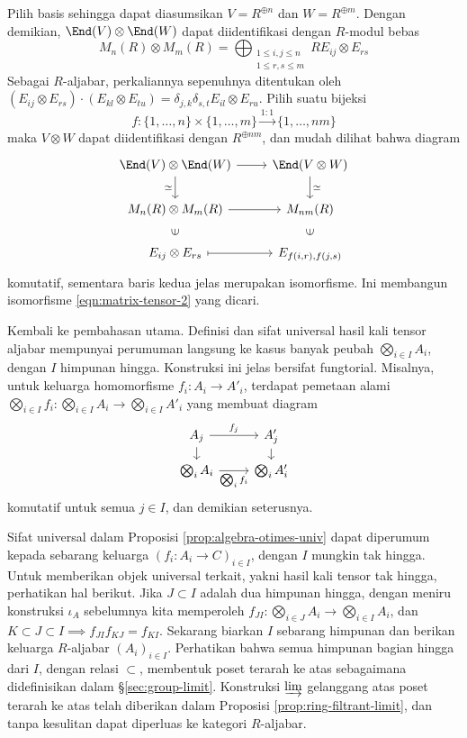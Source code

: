 \begin{example}
	Pilih basis sehingga dapat diasumsikan $V = R^{\oplus n}$ dan $W = R^{\oplus m}$. Dengan demikian, $\End(V) \otimes \End(W)$ dapat diidentifikasi dengan $R$-modul bebas
	\[ M_n(R) \otimes M_m(R) = \bigoplus_{\substack{1 \leq i,j \leq n \\ 1 \leq r,s \leq m}} R E_{ij} \otimes E_{rs}  \]
	Sebagai $R$-aljabar, perkaliannya sepenuhnya ditentukan oleh $(E_{ij} \otimes E_{rs}) \cdot (E_{kl} \otimes E_{tu}) = \delta_{j,k} \delta_{s,t} E_{il} \otimes E_{ru}$. Pilih suatu bijeksi
	\[ f: \{1, \ldots, n\} \times \{1, \ldots, m\} \xrightarrow{1:1} \{1, \ldots, nm\} \]
	maka $V \otimes W$ dapat diidentifikasi dengan $R^{\oplus nm}$, dan mudah dilihat bahwa diagram
	\[\begin{tikzcd}
		\End(V) \otimes \End(W) \arrow[d, "\simeq"'] \arrow[r] & \End(V \otimes W) \arrow[d, "\simeq"] \\
		M_n(R) \otimes M_m(R) \arrow[r] &  M_{nm}(R) \\
		E_{ij} \otimes E_{rs} \arrow[mapsto, r] \arrow[phantom, sloped, u, "\in" description] & E_{f(i,r), f(j,s)} \arrow[phantom, sloped, u, "\in" description]
	\end{tikzcd}\]
	komutatif, sementara baris kedua jelas merupakan isomorfisme. Ini membangun isomorfisme \eqref{eqn:matrix-tensor-2} yang dicari.
\end{example}

Kembali ke pembahasan utama. Definisi dan sifat universal hasil kali tensor aljabar mempunyai perumuman langsung ke kasus banyak peubah $\bigotimes_{i \in I} A_i$, dengan $I$ himpunan hingga. Konstruksi ini jelas bersifat fungtorial. Misalnya, untuk keluarga homomorfisme $f_i: A_i \to A'_i$, terdapat pemetaan alami $\bigotimes_{i \in I} f_i : \bigotimes_{i \in I} A_i \to \bigotimes_{i \in I} A'_i$ yang membuat diagram
\[\begin{tikzcd}[row sep=small]
	A_j \arrow[r, "f_j"] \arrow[d] & A'_j \arrow[d] \\
	\bigotimes_i A_i \arrow[r, "{\bigotimes_i f_i}"'] & \bigotimes_i A'_i
\end{tikzcd}\]
komutatif untuk semua $j \in I$, dan demikian seterusnya.

Sifat universal dalam Proposisi \ref{prop:algebra-otimes-univ} dapat diperumum kepada sebarang keluarga $(f_i: A_i \to C)_{i \in I}$, dengan $I$ mungkin tak hingga. Untuk memberikan objek universal terkait, yakni hasil kali tensor tak hingga, perhatikan hal berikut. Jika $J \subset I$ adalah dua himpunan hingga, dengan meniru konstruksi $\iota_A$ sebelumnya kita memperoleh $f_{JI}: \bigotimes_{i \in J} A_i \to \bigotimes_{i \in I} A_i$, dan $K \subset J \subset I \implies f_{JI} f_{KJ} = f_{KI}$. Sekarang biarkan $I$ sebarang himpunan dan berikan keluarga $R$-aljabar $(A_i)_{i \in I}$. Perhatikan bahwa semua himpunan bagian hingga dari $I$, dengan relasi $\subset$, membentuk poset terarah ke atas sebagaimana didefinisikan dalam \S\ref{sec:group-limit}. Konstruksi $\varinjlim$ gelanggang atas poset terarah ke atas telah diberikan dalam Proposisi \ref{prop:ring-filtrant-limit}, dan tanpa kesulitan dapat diperluas ke kategori $R$-aljabar.

